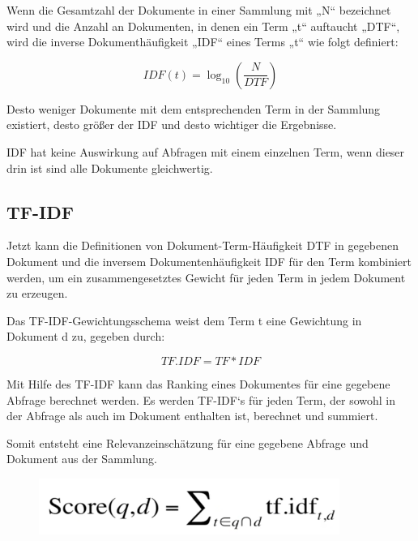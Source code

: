Wenn die Gesamtzahl der Dokumente in einer Sammlung mit „N“ bezeichnet
wird und die Anzahl an Dokumenten, in denen ein Term „t“ auftaucht
„DTF“, wird die inverse Dokumenthäufigkeit „IDF“ eines Terms „t“ wie
folgt definiert: 

\begin{equation*}
\mathit{IDF}\left(t\right)={\log
}_{10}\left(\frac{N}{\mathit{DTF}}\right)
\end{equation*}



Desto weniger Dokumente mit dem entsprechenden Term in der Sammlung
existiert, desto größer der IDF und desto wichtiger die Ergebnisse.

IDF hat keine Auswirkung auf Abfragen mit einem einzelnen Term, wenn
dieser drin ist sind alle Dokumente gleichwertig.


\subsection[TF{}-IDF]{TF-IDF}
Jetzt kann die Definitionen von Dokument-Term-Häufigkeit DTF in
gegebenen Dokument und die inversem Dokumentenhäufigkeit IDF für den
Term kombiniert werden, um ein zusammengesetztes Gewicht für jeden Term
in jedem Dokument zu erzeugen.

Das TF-IDF-Gewichtungsschema weist dem Term t eine Gewichtung in
Dokument d zu, gegeben durch:


\begin{equation*}
\mathit{TF}.\mathit{IDF}=\mathit{TF}{\ast}\mathit{IDF}
\end{equation*}



Mit Hilfe des TF-IDF kann das Ranking eines Dokumentes für eine gegebene
Abfrage berechnet werden. Es werden TF-IDF‘s für jeden Term, der sowohl
in der Abfrage als auch im Dokument enthalten ist, berechnet und
summiert.

Somit entsteht eine Relevanzeinschätzung für eine gegebene Abfrage und
Dokument aus der Sammlung.

\begin{figure}
\centering
\includegraphics[width=9.821cm,height=1.838cm]{bilder/SeminararbeitArkadij-img4.png}
\end{figure}


